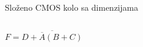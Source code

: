 \begin{frame}[label=09_3-s034]{Složeno CMOS kolo sa dimenzijama}
\begin{columns}[c,onlytextwidth]
\[F=\overline{D+\overline A(B+C)}\]

\begin{center}

\end{center}
\end{columns}
\end{frame}
